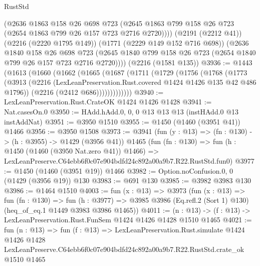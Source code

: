 \begin{lexlean}{RustStd}
\begin{coremodule}
        (@2636
          @1863
          @158
          @26
          @698
          @723
          (@2645 @1863 @799 @158 @26 @723 (@2654 @1863 @799 @26 @157 @723 @2716 @2720))))
      (@2191 (@2212 @41))
      (@2216 (@2220 @1795 @149))
      (@1771 (@2229 @149 @152 @716 @698))
      (@2636
        @1840
        @158
        @26
        @698
        @723
        (@2645 @1840 @799 @158 @26 @723 (@2654 @1840 @799 @26 @157 @723 @2716 @2720))))
    (@2216 (@1581 @135))
@3936 := @1443
    (@1613
      (@1660
        (@1662
          (@1665
            (@1687
              (@1711
                (@1729
                  (@1756
                    (@1768
                      (@1773
                        (@3913
                          (@2216 (LexLeanPreservation.Rust.covered @1424 @1426 @135 @42 @486 @1796))
                          (@2216 (@2412 @686)))))))))))))
@3940 := LexLeanPreservation.Rust.CrateOK @1424 @1426 @1428
@3941 := Nat.casesOn.{0}
@3950 := HAdd.hAdd.{0, 0, 0} @13 @13 @13 (instHAdd.{0} @13 instAddNat)
@3951 := @3950 @1510
@3955 := @1450 (@1460 (@3951 @41)) @1466
@3956 := @3950 @1508
@3973 := @3941
    (fun (y : @13) => (fn : @130) -> (h : @3955) -> @1429 (@3956 @41))
    @1465
    (fun (fn : @130) =>
    fun (h : @1450 (@1460 (@3950 Nat.zero @41)) @1466) =>
    LexLeanPreserve.C64ebb6f0c07e904bdfd24c892a00a9b7.R22.RustStd.fun0)
@3977 := @1450 (@1460 (@3951 @19)) @1466
@3982 := Option.noConfusion.{0, 0} (@1429 (@3956 @19)) @130
@3983 := @691 @130
@3985 := @3982 @3983 @130
@3986 := @1464 @1510
@4003 := fun (x : @13) =>
  @3973
    (fun (x : @13) =>
    fun (fn : @130) =>
    fun (h : @3977) =>
    @3985 @3986 (Eq.refl.{2} (Sort 1) @130) (heq_of_eq.{1} @1449 @3983 @3986 @1465))
@4011 := (n : @13) -> (f : @13) -> LexLeanPreservation.Rust.FunSem @1424 @1426 @1428 @1510 @1465
@4021 := fun (n : @13) =>
  fun (f : @13) =>
  LexLeanPreservation.Rust.simulate
    @1424
    @1426
    @1428
    LexLeanPreserve.C64ebb6f0c07e904bdfd24c892a00a9b7.R22.RustStd.crate_ok
    @1510
    @1465
\end{coremodule}
\end{lexlean}
